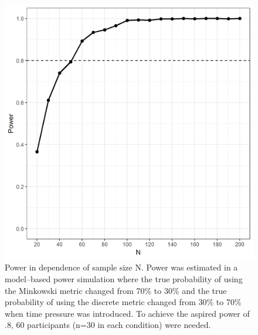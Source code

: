 \documentclass[a4paper,man,natbib]{apa6}
\begin{document}
\begin{figure}[htbp]
\centering
\includegraphics[width = \textwidth]{fig_power.png}
\caption{Power in dependence of sample size N. Power was estimated in a model--based power simulation where the true probability of using the Minkowski metric changed from 70\% to 30\% and the true probability of using the discrete metric changed from 30\% to 70\% when time pressure was introduced. To achieve the aspired power of .8, 60 participants (n=30 in each condition) were needed.}
\label{fig:power}
\end{figure}
\end{document}
